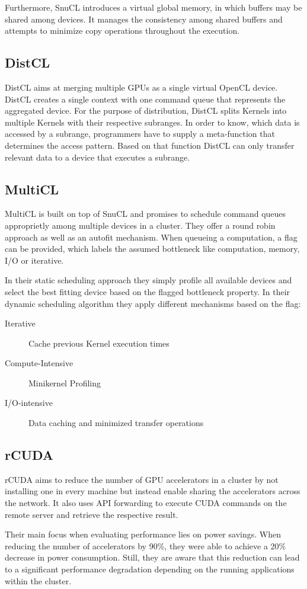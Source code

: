 Furthermore, SnuCL introduces a virtual global memory, in which buffers may be shared among devices. It manages the consistency among shared buffers and attempts to minimize copy operations throughout the execution.

\subsection{DistCL\cite{distcl}}
DistCL aims at merging multiple GPUs as a single virtual OpenCL device. DistCL creates a single context with one command queue that represents the aggregated device. For the purpose of distribution, DistCL splits Kernels into multiple Kernels with their respective subranges. In order to know, which data is accessed by a subrange, programmers have to supply a meta-function that determines the access pattern. Based on that function DistCL can only transfer relevant data to a device that executes a subrange.

\subsection{MultiCL\cite{multicl}}

MultiCL is built on top of SnuCL and promises to schedule command queues approprietly among multiple devices in a cluster. They offer a round robin approach as well as an autofit mechanism. When queueing a computation, a flag can be provided, which labels the assumed bottleneck like computation, memory, I/O or iterative.

In their static scheduling approach they simply profile all available devices and select the best fitting device based on the flagged bottleneck property. In their dynamic scheduling algorithm they apply different mechanisms based on the flag:

\begin{description}
\item [Iterative] Cache previous Kernel execution times
\item [Compute-Intensive] Minikernel Profiling
\item [I/O-intensive] Data caching and minimized transfer operations
\end{description}

\subsection{rCUDA\cite{rcuda}}

rCUDA aims to reduce the number of GPU accelerators in a cluster by not installing one in every machine but instead enable sharing the accelerators across the network. It also uses API forwarding to execute CUDA commands on the remote server and retrieve the respective result.

Their main focus when evaluating performance lies on power savings. When reducing the number of accelerators by 90\%, they were able to achieve a 20\% decrease in power consumption. Still, they are aware that this reduction can lead to a significant performance degradation depending on the running applications within the cluster.
